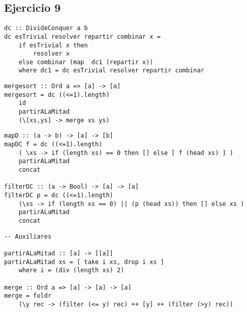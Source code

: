\subsection{Ejercicio 9}
\begin{centrado}
	\begin{verbatim}
dc :: DivideConquer a b
dc esTrivial resolver repartir combinar x = 
	if esTrivial x then 
		resolver x 
	else combinar (map  dc1 (repartir x))
	where dc1 = dc esTrivial resolver repartir combinar

\end{verbatim}
\end{centrado}

\begin{centrado}
	\begin{verbatim}
mergesort :: Ord a => [a] -> [a]
mergesort = dc ((<=1).length)
	id
	partirALaMitad
	(\[xs,ys] -> merge xs ys)	
	\end{verbatim}
\end{centrado}

\begin{centrado}
	\begin{verbatim}
mapD :: (a -> b) -> [a] -> [b]
mapDC f = dc ((<=1).length)
	( \xs -> if (length xs) == 0 then [] else [ f (head xs) ] )
	partirALaMitad
	concat

filterDC :: (a -> Bool) -> [a] -> [a]
filterDC p = dc ((<=1).length)
	(\xs -> if (length xs == 0) || (p (head xs)) then [] else xs )
	partirALaMitad
	concat
	\end{verbatim}
\end{centrado}

\begin{centrado}
	\begin{verbatim}
-- Auxiliares

partirALaMitad :: [a] -> [[a]]
partirALaMitad xs = [ take i xs, drop i xs ] 
	where i = (div (length xs) 2)

merge :: Ord a => [a] -> [a] -> [a]
merge = foldr 
	(\y rec -> (filter (<= y) rec) ++ [y] ++ (filter (>y) rec))	 
	\end{verbatim}
\end{centrado}

